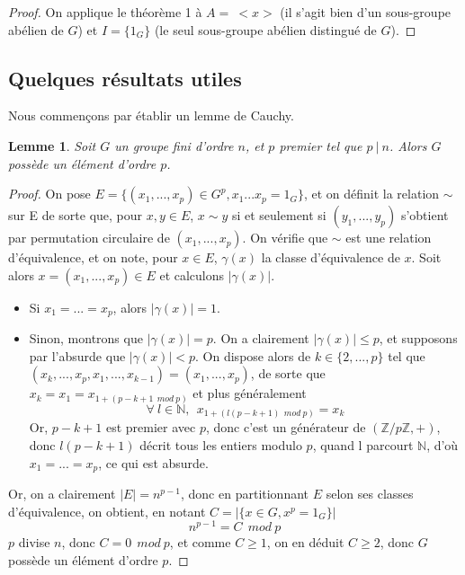 \documentclass[10pt,a4paper]{article}
\newtheorem{lemma}{Lemme}
\begin{document}
\begin{proof}
On applique le théorème 1 à $A=\:<x>$ (il s'agit bien d'un sous-groupe abélien de $G$) et $I=\{1_{G}\}$ (le seul sous-groupe abélien distingué de $G$).
\end{proof}

\subsection{Quelques résultats utiles}

Nous commençons par établir un lemme de Cauchy.
\begin{lemma}
Soit $G$ un groupe fini d'ordre $n$, et $p$ premier tel que $p\: | \: n$. Alors $G$ possède un élément d'ordre $p$.
\end{lemma}

\begin{proof}
On pose $E = \{(x_{1},...,x_{p}) \in G^{p}, x_{1}...x_{p} = 1_{G} \}$, et on définit la relation $\sim$ sur E de sorte que, pour $x,y \in E$, $x \sim y$ si et seulement si $(y_{1},...,y_{p})$ s'obtient par permutation circulaire de $(x_{1},...,x_{p})$. On vérifie que $\sim$ est une relation d'équivalence, et on note, pour $x \in E$, $\gamma (x)$ la classe d'équivalence de $x$. Soit alors $x=(x_{1},...,x_{p}) \in E$ et calculons $| \gamma (x)|$.

\renewcommand{\labelitemi}{$-$}
\begin{itemize}
\item Si $x_{1} = ... = x_{p}$, alors $| \gamma (x) | = 1$.
\item Sinon, montrons que $| \gamma (x) | = p$. On a clairement $| \gamma (x) | \leq p$, et supposons par l'absurde que $| \gamma (x) | < p$. On dispose alors de $k \in \{2,...,p\}$ tel que $(x_{k},...,x_{p},x_{1},...,x_{k-1})= (x_{1},...,x_{p})$, de sorte que $x_{k}=x_{1}=x_{1+(p-k+1 \:\: mod \: p)}$ et plus généralement 
$$ \forall \: l\in \mathbb{N}, \:\: x_{1+(l(p-k+1) \:\: mod \: p)}=x_{k}$$
Or, $p-k+1$ est premier avec $p$, donc c'est un générateur de $(\mathbb{Z}/p\mathbb{Z},+)$, donc $l(p-k+1)$ décrit tous les entiers modulo $p$, quand l parcourt $\mathbb{N}$, d'où $x_{1}=...=x_{p}$, ce qui est absurde.
\end{itemize}
Or, on a clairement $|E|=n^{p-1}$, donc en partitionnant $E$ selon ses classes d'équivalence, on obtient, en notant $C=|\{x \in G,x^{p}=1_{G}\}|$
$$n^{p-1} = C \:\: mod\: p$$
 $p$ divise $n$, donc $C = 0 \:\: mod \: p$, et comme $C\geq 1$, on en déduit $C\geq 2$, donc $G$ possède un élément d'ordre $p$.

\end{proof}
\end{document}
